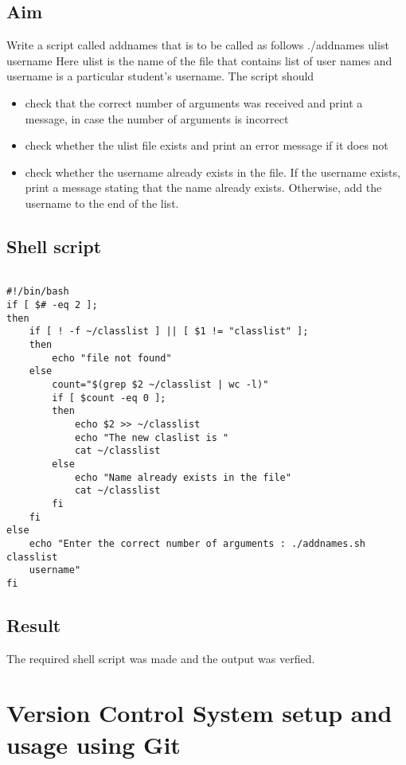 \documentclass{article}
\begin{document}
\subsection{Aim}
Write a script called addnames that is to be called as follows ./addnames ulist username
Here ulist is the name of the file that contains list of user names and username is a particular student's username. The script should
\begin{itemize}
\item check that the correct number of arguments was received and print a message, in case the number of arguments is incorrect
\item check whether the ulist file exists and print an error message if it does not
\item check whether the username already exists in the file. If the username exists, print a message stating that the name already exists. Otherwise, add the username to the end of
the list.
\end{itemize}

\subsection{Shell script}
\begin{verbatim}

#!/bin/bash
if [ $# -eq 2 ];
then
    if [ ! -f ~/classlist ] || [ $1 != "classlist" ];
    then 
        echo "file not found"
    else
        count="$(grep $2 ~/classlist | wc -l)"
        if [ $count -eq 0 ];
        then 
            echo $2 >> ~/classlist
            echo "The new claslist is "
            cat ~/classlist
        else
            echo "Name already exists in the file"
            cat ~/classlist
        fi
    fi
else
    echo "Enter the correct number of arguments : ./addnames.sh classlist
    username"
fi

\end{verbatim}

\subsection{Result}
The required shell script was made and the output was verfied.

\newpage

\section{Version Control System setup and usage using Git}
\end{document}
